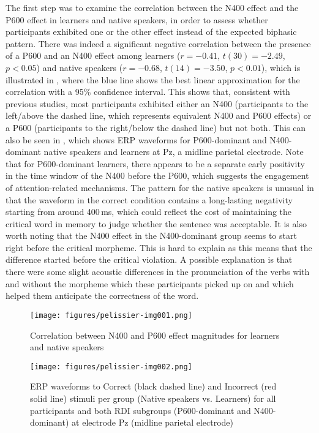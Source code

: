 \documentclass[output=paper,colorlinks,citecolor=brown,modfonts,nonflat]{../langscibook}
\begin{document}
The first step was to examine the correlation between the N400 effect and the P600 effect in learners and native speakers, in order to assess whether participants exhibited one or the other effect instead of the expected biphasic pattern. There was indeed a significant negative correlation between the presence of a P600 and an N400 effect among learners ($r = -0.41$, $t(30) = -2.49$, $p < 0.05$) and native speakers ($r = -0.68$, $t(14) = -3.50$, $p < 0.01$), which is illustrated in , where the blue line shows the best linear approximation for the correlation with a 95\% confidence interval. This shows that, consistent with previous studies, most participants exhibited either an N400 (participants to the left\slash above the dashed line, which represents equivalent N400 and P600 effects) or a P600 (participants to the right/below the dashed line) but not both. This can also be seen in , which shows ERP waveforms for P600-dominant and N400-dominant native speakers and learners at Pz, a midline parietal electrode. Note that for P600-dominant learners, there appears to be a separate early positivity in the time window of the N400 before the P600, which suggests the engagement of attention-related mechanisms. The pattern for the native speakers is unusual in that the waveform in the correct condition contains a long-lasting negativity starting from around 400\,ms, which could reflect the cost of maintaining the critical word in memory to judge whether the sentence was acceptable. It is also worth noting that the N400 effect in the N400-dominant group seems to start right before the critical morpheme. This is hard to explain as this means that the difference started before the critical violation. A possible explanation is that there were some slight acoustic differences in the pronunciation of the verbs with and without the morpheme which these participants picked up on and which helped them anticipate the correctness of the word.

\begin{figure}[p]
\texttt{[image: figures/pelissier-img001.png]}
\caption{Correlation between N400 and P600 effect magnitudes for learners and native speakers\label{fig:pelissier:1}}
\end{figure}


\begin{figure}[p]
\texttt{[image: figures/pelissier-img002.png]}
\caption{ERP  waveforms  to  Correct  (black  dashed  line)  and  Incorrect  (red  solid  line)  stimuli  per  group  (Native  speakers  vs.  Learners)  for  all  participants  and  both  RDI  subgroups  (P600-dominant  and  N400-dominant)  at  electrode  Pz  (midline  parietal  electrode)\label{fig:pelissier:2}}
\end{figure}
\end{document}
